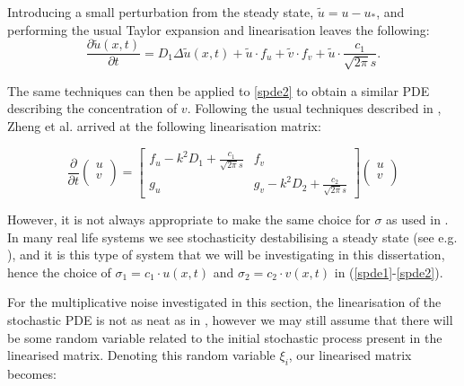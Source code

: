 \documentclass[12pt]{article}
\begin{document}
Introducing a small perturbation from the steady state, $\tilde{u} = u - u_\ast$, and performing the usual Taylor expansion and linearisation leaves the following:
\begin{equation}
\frac{\partial \tilde{u}(x,t)}{\partial t} = D_1\Delta \tilde{u}(x,t) + \tilde{u}\cdot f_u + \tilde{v}\cdot f_v + \tilde{u}\cdot\frac{c_1}{\sqrt{2\pi}s}.
\end{equation}

The same techniques can then be applied to \eqref{spde2} to obtain a similar PDE describing the concentration of $v$. Following the usual techniques described in \cite{Murray, Turing, Britton}, Zheng et al. arrived at the following linearisation matrix:

\begin{equation}\label{Zhenglinsys}
    \frac{\partial}{\partial{t}} 
    \left(
    \begin{array}{c}
    u\\
    v\\
    \end{array}
    \right)
    = 
    \left[
    \begin{array}{cc}
      f_u - k^2D_1 + \frac{c_1}{\sqrt{2\pi}s}   & f_v \\
      g_u   &  g_v - k^2D_2 + \frac{c_2}{\sqrt{2\pi}s}
    \end{array}
    \right]
    \left(
    \begin{array}{c}
    u\\
    v\\
    \end{array}
    \right)
\end{equation}

However, it is not always appropriate to make the same choice for $\sigma$ as used in \cite{Zheng}. In many real life systems we see stochasticity destabilising a steady state (see e.g. \cite{Smolen}), and it is this type of system that we will be investigating in this dissertation, hence the choice of $\sigma_1 = c_1\cdot u(x,t)$ and $\sigma_2 = c_2\cdot v(x,t)$ in (\ref{spde1}-\ref{spde2}).

For the multiplicative noise investigated in this section, the linearisation of the stochastic PDE is not as neat as in \cite{Zheng}, however we may still assume that there will be some random variable related to the initial stochastic process present in the linearised matrix. Denoting this random variable $\xi_i$, our linearised matrix becomes:
\end{document}
